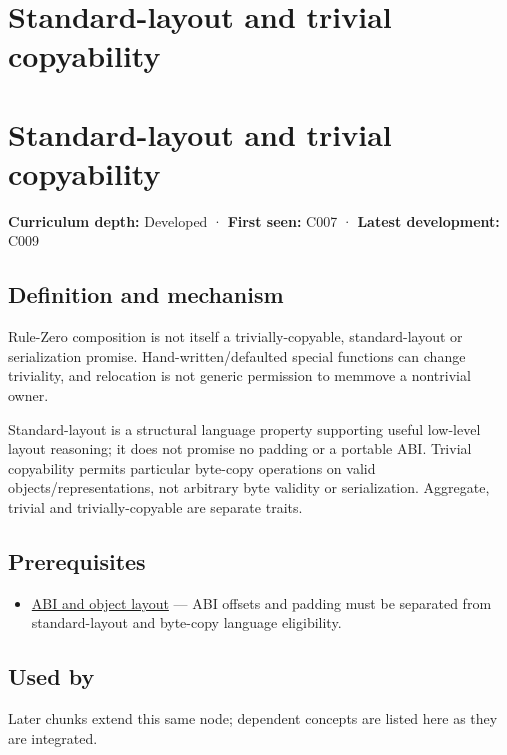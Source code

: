 \hypertarget{appendix-958870a64c53}{}
\section*{Standard-layout and trivial copyability}
\section{Standard-layout and trivial copyability}\label{appendix-958870a64c53-standard-layout-and-trivial-copyability}

\textbf{Curriculum depth:} Developed · \textbf{First seen:} C007 · \textbf{Latest development:} C009

\subsection{Definition and mechanism}\label{appendix-958870a64c53-definition-and-mechanism}

Rule-Zero composition is not itself a trivially-copyable, standard-layout or serialization promise. Hand-written/defaulted special functions can change triviality, and relocation is not generic permission to memmove a nontrivial owner.

Standard-layout is a structural language property supporting useful low-level layout reasoning; it does not promise no padding or a portable ABI. Trivial copyability permits particular byte-copy operations on valid objects/representations, not arbitrary byte validity or serialization. Aggregate, trivial and trivially-copyable are separate traits.

\subsection{Prerequisites}\label{appendix-958870a64c53-prerequisites}

\begin{itemize}
\tightlist
\item
  \hyperref[appendix-c4ac6bb0fff8]{ABI and object layout} --- ABI offsets and padding must be separated from standard-layout and byte-copy language eligibility.
\end{itemize}

\subsection{Used by}\label{appendix-958870a64c53-used-by}

Later chunks extend this same node; dependent concepts are listed here as they are integrated.

